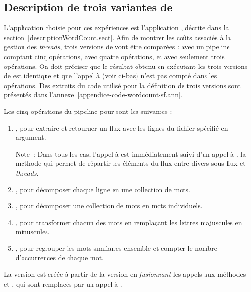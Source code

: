\subsection{Description de trois variantes de }

L'application choisie pour ces exp\'eriences est l'application , d\'ecrite dans la section~\ref{descriptionWordCount.sect}. Afin de montrer les coûts associés à la gestion des \emph{threads}, trois versions de  vont être comparées :  avec un pipeline comptant cinq op\'erations,  avec quatre opérations, et  avec seulement trois op\'erations. On doit pr\'eciser que le r\'esultat obtenu en ex\'ecutant les trois versions de  est identique et que l'appel à  (voir ci-bas) n'est pas compté dans les opérations. Des extraits du code utilis\'e pour la définition de trois versions sont pr\'esent\'es dans l'annexe~\ref{appendice-code-wordcount-sf.ann}. 

\goodbreak
Les cinq op\'erations du pipeline pour  sont les suivantes :
\begin{enumerate}
\item {}, pour extraire et retourner un flux avec les lignes du fichier sp\'ecifi\'e en argument.

Note~: Dans tous les cas, l'appel à  est immédiatement suivi d'un appel à , la m\'ethode qui permet de r\'epartir les \'el\'ements du flux entre divers sous-flux et \emph{threads}.

\item {}, pour d\'ecomposer chaque ligne en une collection de mots.

\item {}, pour d\'ecomposer une collection de mots en mots individuels.

\item {}, pour transformer chacun des mots en rempla\c{c}ant les lettres majuscules en minuscules.

\item {}, pour regrouper les mots similaires ensemble et compter le nombre d'occurrences de chaque mot.
\end{enumerate}

La version  est cr\'e\'ee \`a partir de la version  en \emph{fusionnant} les appels aux m\'ethodes  et , qui sont remplac\'es par un appel à .

